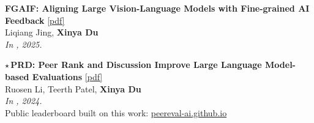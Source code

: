 \begin{enumerate}[{[}1{]},leftmargin=*]
\parbox{\linewidth}{
\item
 
{\bf FGAIF: Aligning Large Vision-Language Models with Fine-grained AI Feedback}
\href{https://openreview.net/pdf?id=Qhfw5CUVd7}{{{[pdf]}}} \\
     Liqiang Jing, \textbf{Xinya Du}\\
{\it In \TMLR, 2025.} \\
}

\parbox{\linewidth}{
\item\label{pub:prd}
$\star$\,{\bf PRD: Peer Rank and Discussion Improve Large Language Model-based Evaluations} 
\href{https://openreview.net/pdf?id=YVD1QqWRaj}{{{[pdf]}}} \\
      Ruosen Li, Teerth Patel, \textbf{Xinya Du} \\
{\it In \TMLR, 2024.} \\
Public leaderboard built on this work: \href{https://peereval-ai.github.io}{peereval-ai.github.io} \\
}

\end{enumerate}

